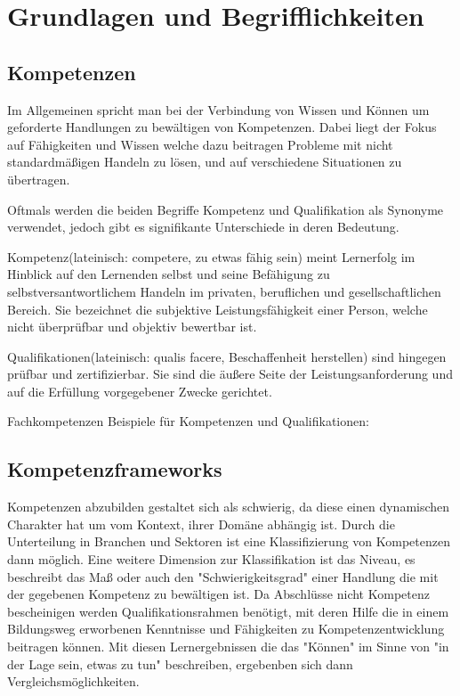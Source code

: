 \section{Grundlagen und Begrifflichkeiten}\label{2_grundlagen}


\subsection{Kompetenzen}\label{competencies}

Im Allgemeinen spricht man bei der Verbindung von Wissen und Können um geforderte Handlungen zu bewältigen von Kompetenzen. Dabei liegt der Fokus auf Fähigkeiten und Wissen welche dazu beitragen Probleme mit nicht standardmäßigen Handeln zu lösen, und auf verschiedene Situationen zu übertragen.\cite{bibb}

Oftmals werden die beiden Begriffe Kompetenz und Qualifikation als Synonyme verwendet, jedoch gibt es signifikante Unterschiede in deren Bedeutung. 
\vspace{1em}
 
Kompetenz(lateinisch: competere, zu etwas fähig sein) meint Lernerfolg im Hinblick auf den Lernenden selbst und seine Befähigung zu selbstversantwortlichem Handeln im privaten, beruflichen und gesellschaftlichen Bereich. Sie bezeichnet die subjektive Leistungsfähigkeit einer Person, welche nicht überprüfbar und objektiv bewertbar ist.

Qualifikationen(lateinisch: qualis facere, Beschaffenheit herstellen) sind hingegen prüfbar und zertifizierbar. Sie sind die äußere Seite der Leistungsanforderung und auf die Erfüllung vorgegebener Zwecke gerichtet. 

\cite{2017}
 
Fachkompetenzen
Beispiele für Kompetenzen und Qualifikationen:

\subsection{Kompetenzframeworks}

Kompetenzen abzubilden gestaltet sich als schwierig, da diese einen dynamischen Charakter hat um vom Kontext, ihrer Domäne abhängig ist. Durch die Unterteilung in Branchen und Sektoren ist eine Klassifizierung von Kompetenzen dann möglich. Eine weitere Dimension zur Klassifikation ist das Niveau, es beschreibt das Maß oder auch den "Schwierigkeitsgrad" einer Handlung die mit der gegebenen Kompetenz zu bewältigen ist. 
\vspace{1em}
Da Abschlüsse nicht Kompetenz bescheinigen werden Qualifikationsrahmen benötigt, mit deren Hilfe die in einem Bildungsweg erworbenen Kenntnisse und Fähigkeiten zu Kompetenzentwicklung beitragen können. Mit diesen Lernergebnissen die das "Können" im Sinne von "in der Lage sein, etwas zu tun" beschreiben, ergebenben sich dann Vergleichsmöglichkeiten.

